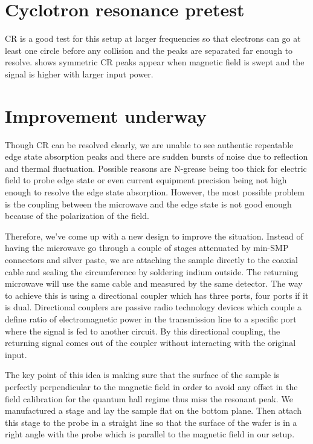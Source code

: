 \documentclass[12pt]{ruthesis}
\begin{document}
 


 
 
\section{Cyclotron resonance pretest}\label{Cyclotron}

CR is a good test for this setup at larger frequencies so that electrons can go at least one circle before any collision and the peaks are separated far enough to resolve. 
 shows symmetric CR peaks appear when magnetic field is swept and the signal is higher with larger input power.  









\section{Improvement underway}\label{Improvement}

Though CR can be resolved clearly, we are unable to see authentic repeatable edge state absorption peaks
and there are sudden bursts of noise due to reflection and thermal fluctuation.
Possible reasons are N-grease being too thick for electric field to probe edge state or even current equipment precision being not high enough to resolve the edge state absorption. 
However, the most possible problem is the coupling between the microwave and the edge state is not good enough because of the polarization of the field. 


Therefore, we've come up with a new design to improve the situation. 
Instead of having the microwave go through a couple of stages attenuated by min-SMP connectors and silver paste, we are attaching the sample directly to the coaxial cable and sealing the circumference by soldering indium outside. 
The returning microwave will use the same cable and measured by the same detector.
The way to achieve this is using a directional coupler which has three ports, four ports if it is dual. 
Directional couplers are passive radio technology devices which couple a define ratio of electromagnetic power in the transmission line to a specific port where the signal is fed to another circuit. 
By this directional coupling, the returning signal comes out of the coupler without interacting with the original input.

The key point of this idea is making sure that the surface of the sample is perfectly perpendicular to the magnetic field in order to avoid any offset in the field calibration for the quantum hall regime thus miss the resonant peak.  
We manufactured a stage and lay the sample flat on the bottom plane. 
Then attach this stage to the probe in a straight line so that the surface of the wafer is in a right angle with the probe which is parallel to the magnetic field in our setup. 
\end{document}
